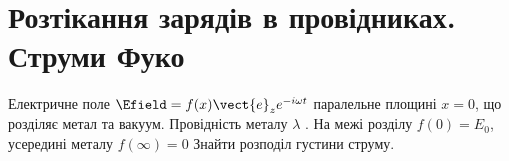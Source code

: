\section{Розтікання зарядів в провідниках. Струми Фуко}


\begin{problem}
Електричне поле $\Efield = f(x)\vect{e}_ze^{- i\omega t} $  паралельне площині $x = 0$, що розділяє метал та вакуум. Провідність металу $\lambda$ . На межі розділу  $f(0) = E_0$, усередині металу  $f(\infty) = 0$  Знайти розподіл густини струму.
\end{problem}

